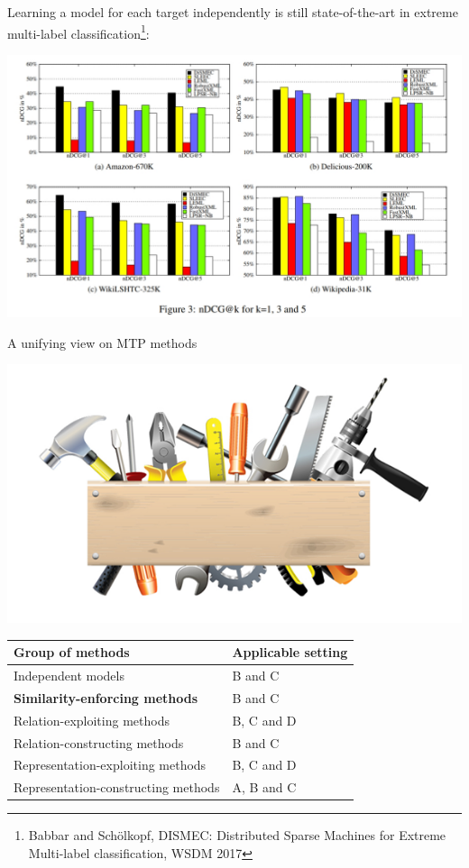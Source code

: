 \documentclass[]{beamer}
\renewcommand{\alert}[1]{\textbf{\color{putblue} #1}}
\begin{document}
\begin{frame}

\begin{center}
Learning a model for each target independently is still state-of-the-art in extreme multi-label classification\footnote{Babbar and Sch\"olkopf, DISMEC: Distributed Sparse Machines for Extreme Multi-label classification, WSDM 2017}:

\includegraphics[scale=0.3]{Figures/dismec} 
\end{center}

\end{frame}

\begin{frame}{A unifying view on MTP methods}

\begin{center}
\includegraphics[scale=0.3]{pics/tools}

\begin{tabular}{ll}
\hline
Group of methods & Applicable setting \\
\hline
\hline
Independent models & B and C \\
\alert{Similarity-enforcing methods} & B and C   \\ 
Relation-exploiting methods & B, C and D  \\
Relation-constructing methods & B and C \\
Representation-exploiting methods & B, C and D \\
Representation-constructing methods & A, B and C \\
\hline  
\end{tabular}
\end{center}
\end{frame}
\end{document}
